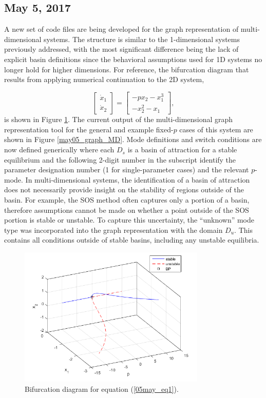 \documentclass[12pt]{article}
\begin{document}
\subsection{May 5, 2017}
A new set of code files are being developed for the graph representation of multi-dimensional systems. The structure is similar to the 1-dimensional systems previously addressed, with the most significant difference being the lack of explicit basin definitions since the behavioral assumptions used for 1D systems no longer hold for higher dimensions. For reference, the bifurcation diagram that results from applying numerical continuation to the 2D system,

\begin{equation}
\label{05may_eq1}
\begin{bmatrix}
\dot{x}_1 \\ \dot{x}_2
\end{bmatrix}
=
\begin{bmatrix}
-px_2-x_1^3 \\ -x_2^2-x_1
\end{bmatrix},
\end{equation}
is shown in Figure \ref{may05_bfd_MD}. The current output of the multi-dimensional graph representation tool for the general and example fixed-$p$ cases of this system are shown in Figure \ref{may05_graph_MD}. Mode definitions and switch conditions are now defined generically where each $D_s$ is a basin of attraction for a stable equilibrium and the following 2-digit number in the subscript identify the parameter designation number (1 for single-parameter cases) and the relevant $p$-mode. In multi-dimensional systems, the identification of a basin of attraction does not necessarily provide insight on the stability of regions outside of the basin. For example, the SOS method often captures only a portion of a basin, therefore assumptions cannot be made on whether a point outside of the SOS portion is stable or unstable. To capture this uncertainty, the ``unknown'' mode type was incorporated into the graph representation with the domain $D_u$. This contains all conditions outside of stable basins, including any unstable equilibria.

\begin{figure}[H]
\begin{center}
\includegraphics[width=3.5in]{may05_bfd_MD.png}
\caption{Bifurcation diagram for equation (\ref{05may_eq1}).}
\label{may05_bfd_MD}
\end{center}
\end{figure}
\end{document}
